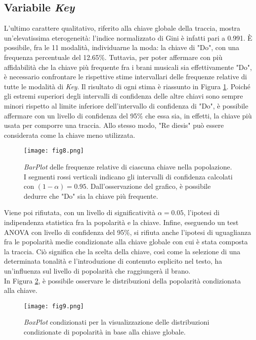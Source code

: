 \documentclass[fleqn,10pt]{SelfArx} %
\begin{document}
\subsection*{Variabile \textit{Key}}
L'ultimo carattere qualitativo, riferito alla chiave globale della traccia, mostra un'elevatissima eterogeneità: l'indice normalizzato di Gini è infatti pari a 0.991. È possibile, fra le 11 modalità, individuarne la moda: la chiave di "Do", con una frequenza percentuale del 12.65\%. Tuttavia, per poter affermare con più affidabilità che la chiave più frequente fra i brani musicali sia effettivamente "Do", è necessario confrontare le rispettive stime intervallari delle frequenze relative di tutte le modalità di \textit{Key}. Il risultato di ogni stima è riassunto in Figura \ref{fig:fig8}. Poiché gli estremi superiori degli intervalli di confidenza delle altre chiavi sono sempre minori rispetto al limite inferiore dell'intervallo di confidenza di "Do", è possibile affermare con un livello di confidenza del 95\% che essa sia, in effetti, la chiave più usata per comporre una traccia. Allo stesso modo, "Re diesis" può essere considerata come la chiave meno utilizzata.
\begin{figure}[H]
    \centering
    \texttt{[image: fig8.png]}
    \label{fig:fig8}
    \caption{\textit{BarPlot} delle frequenze relative di ciascuna chiave nella popolazione. I segmenti rossi verticali indicano gli intervalli di confidenza calcolati con $(1-\alpha)=0.95$. Dall'osservazione del grafico, è possibile dedurre che "Do" sia la chiave più frequente.}
\end{figure}
Viene poi rifiutata, con un livello di significatività $\alpha=0.05$, l'ipotesi di indipendenza statistica fra la popolarità e la chiave. Infine, eseguendo un test ANOVA con livello di confidenza del 95\%, si rifiuta anche l'ipotesi di uguaglianza fra le popolarità medie condizionate alla chiave globale con cui è stata composta la traccia. Ciò significa che la scelta della chiave, così come la selezione di una determinata tonalità e l'introduzione di contenuto esplicito nel testo, ha un'influenza sul livello di popolarità che raggiungerà il brano.\\
In Figura \ref{fig:fig9}, è possibile osservare le distribuzioni della popolarità condizionata alla chiave.
\begin{figure}[H]
    \centering
    \texttt{[image: fig9.png]}
    \label{fig:fig9}
    \caption{\textit{BoxPlot} condizionati per la visualizzazione delle distribuzioni condizionate di popolarità in base alla chiave globale.}
\end{figure}
\end{document}
